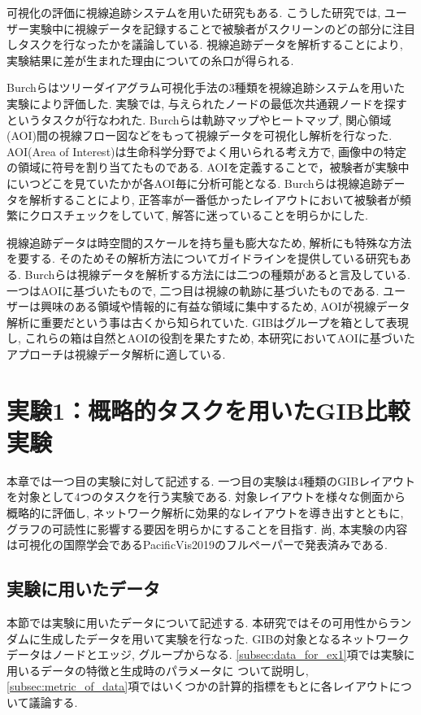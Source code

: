 \documentclass{kuee}
\begin{document}
可視化の評価に視線追跡システムを用いた研究もある\cite{burch2011evaluation,pohl2009comparing,netzel2014comparative,jianu2014display,7539393,ueno2019exploration}.
こうした研究では, ユーザー実験中に視線データを記録することで被験者がスクリーンのどの部分に注目しタスクを行なったかを議論している.
視線追跡データを解析することにより, 実験結果に差が生まれた理由についての糸口が得られる.

Burchらはツリーダイアグラム可視化手法の3種類を視線追跡システムを用いた実験により評価した\cite{burch2011evaluation}.
実験では, 与えられたノードの最低次共通親ノードを探すというタスクが行なわれた.
Burchらは軌跡マップやヒートマップ, 関心領域(AOI)間の視線フロー図などをもって視線データを可視化し解析を行なった.
AOI(Area of Interest)は生命科学分野でよく用いられる考え方で, 画像中の特定の領域に符号を割り当てたものである.
AOIを定義することで，被験者が実験中にいつどこを見ていたかが各AOI毎に分析可能となる.
Burchらは視線追跡データを解析することにより, 正答率が一番低かったレイアウトにおいて被験者が頻繁にクロスチェックをしていて, 解答に迷っていることを明らかにした.

視線追跡データは時空間的スケールを持ち量も膨大なため, 解析にも特殊な方法を要する.
そのためその解析方法についてガイドラインを提供している研究もある\cite{andrienko2012visual,kurzhals2014evaluating,duchowski2007eye}.
Burchらは視線データを解析する方法には二つの種類があると言及している\cite{Burch2013VisualTS}.
一つはAOIに基づいたもので, 二つ目は視線の軌跡に基づいたものである.
ユーザーは興味のある領域や情報的に有益な領域に集中するため, AOIが視線データ解析に重要だという事は古くから知られていた\cite{yarbus1967eye}.
GIBはグループを箱として表現し, これらの箱は自然とAOIの役割を果たすため, 本研究においてAOIに基づいたアプローチは視線データ解析に適している.


\chapter{実験1：概略的タスクを用いたGIB比較実験}
\label{chap:experiment1}
本章では一つ目の実験に対して記述する.
一つ目の実験は4種類のGIBレイアウトを対象として4つのタスクを行う実験である.
対象レイアウトを様々な側面から概略的に評価し, ネットワーク解析に効果的なレイアウトを導き出すとともに, グラフの可読性に影響する要因を明らかにすることを目指す.
尚, 本実験の内容は可視化の国際学会であるPacificVis2019のフルペーパーで発表済みである\cite{8781570}.

\section{実験に用いたデータ}
\label{sec:data}
本節では実験に用いたデータについて記述する.
本研究ではその可用性からランダムに生成したデータを用いて実験を行なった.
GIBの対象となるネットワークデータはノードとエッジ, グループからなる.
\ref{subsec:data_for_ex1}項では実験に用いるデータの特徴と生成時のパラメータに
ついて説明し, \ref{subsec:metric_of_data}項ではいくつかの計算的指標をもとに各レイアウトについて議論する.
\end{document}

